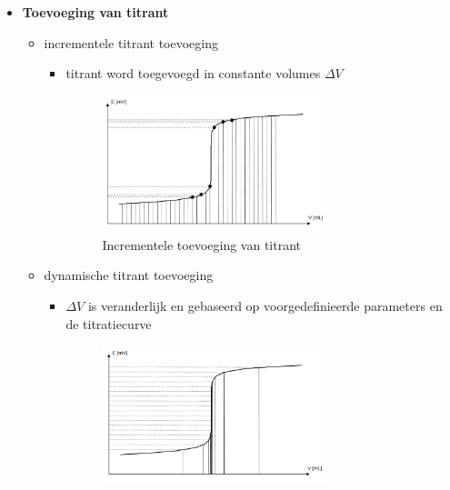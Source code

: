 \documentclass[10pt]{report}
\begin{document}
\begin{itemize}
\begin{itemize}
            \item \textbf{Toevoeging van titrant}
                \begin{itemize}
                    \item incrementele titrant toevoeging
                        \begin{itemize}
                            \item titrant word toegevoegd in constante volumes $\Delta V$ \newpage
                                \begin{figure}[h]
                                    \centering
                                    \includegraphics[width=0.7\textwidth]{rfpcir2.png}
                                    \caption{Incrementele toevoeging van titrant}
                                \end{figure}
                        \end{itemize}
                    \item dynamische titrant toevoeging
                        \begin{itemize}
                            \item $\Delta V$ is veranderlijk en gebaseerd op voorgedefinieerde parameters en de titratiecurve
                                \begin{figure}[h]
                                    \centering
                                    \includegraphics[width=0.7\textwidth]{rfpcir3.png}

\end{figure}
\end{itemize}
\end{itemize}
\end{itemize}
\end{itemize}
\end{document}
